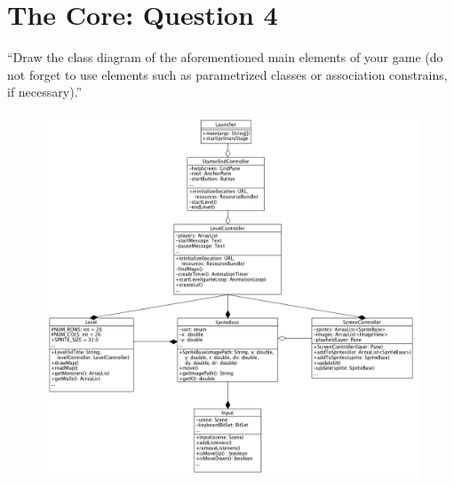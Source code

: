 \chapter{The Core: Question 4}

``Draw the class diagram of the aforementioned main elements of your game (do not forget to use elements such as parametrized classes or association constrains, if necessary).''

\begin{figure}[h]
\includegraphics[width=\textwidth]{classDiagramsMain}
\end{figure}